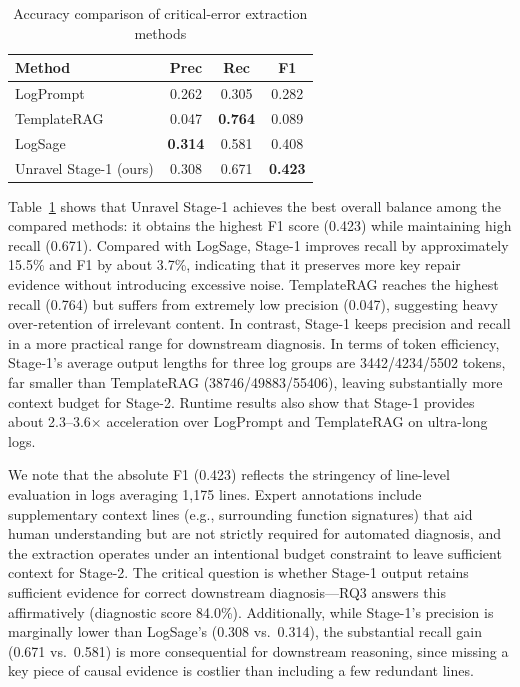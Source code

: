 \documentclass[sigconf,anonymous]{acmart}
\begin{document}
\begin{table}[htbp]
\centering
\caption{Accuracy comparison of critical-error extraction methods}
\label{tab:mgsc-results}
\begin{tabular}{lccc}
\hline
\textbf{Method} & \textbf{Prec} & \textbf{Rec} & \textbf{F1} \\
\hline
LogPrompt & 0.262 & 0.305 & 0.282 \\
TemplateRAG & 0.047 & \textbf{0.764} & 0.089 \\
LogSage & \textbf{0.314} & 0.581 & 0.408 \\
Unravel Stage-1 (ours) & 0.308 & 0.671 & \textbf{0.423} \\
\hline
\end{tabular}
\end{table}

Table~\ref{tab:mgsc-results} shows that Unravel Stage-1 achieves the best overall balance among the compared methods: it obtains the highest F1 score (0.423) while maintaining high recall (0.671). Compared with LogSage, Stage-1 improves recall by approximately 15.5\% and F1 by about 3.7\%, indicating that it preserves more key repair evidence without introducing excessive noise. TemplateRAG reaches the highest recall (0.764) but suffers from extremely low precision (0.047), suggesting heavy over-retention of irrelevant content. In contrast, Stage-1 keeps precision and recall in a more practical range for downstream diagnosis. In terms of token efficiency, Stage-1's average output lengths for three log groups are 3442/4234/5502 tokens, far smaller than TemplateRAG (38746/49883/55406), leaving substantially more context budget for Stage-2. Runtime results also show that Stage-1 provides about 2.3--3.6$\times$ acceleration over LogPrompt and TemplateRAG on ultra-long logs.

We note that the absolute F1 (0.423) reflects the stringency of line-level evaluation in logs averaging 1{,}175 lines. Expert annotations include supplementary context lines (e.g., surrounding function signatures) that aid human understanding but are not strictly required for automated diagnosis, and the extraction operates under an intentional budget constraint to leave sufficient context for Stage-2. The critical question is whether Stage-1 output retains sufficient evidence for correct downstream diagnosis---RQ3 answers this affirmatively (diagnostic score 84.0\%). Additionally, while Stage-1's precision is marginally lower than LogSage's (0.308 vs.\ 0.314), the substantial recall gain (0.671 vs.\ 0.581) is more consequential for downstream reasoning, since missing a key piece of causal evidence is costlier than including a few redundant lines.
\end{document}
